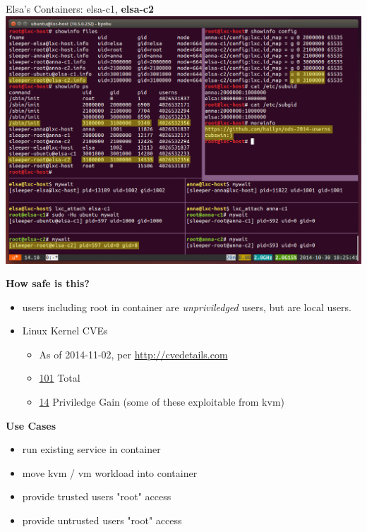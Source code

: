 \documentclass{beamer}
\begin{document}
\begin{frame}
Elsa's Containers: elsa-c1, \textbf{elsa-c2}
\includegraphics[width=\textwidth]{screen-elsa-c2.png}
\end{frame}

\begin{frame}
\textbf{How safe is this?}
\begin{itemize}
\item users including root in container are \textit{unpriviledged} users, but are local users.
\item Linux Kernel CVEs
  \begin{itemize}
  \item As of 2014-11-02, per \url{http://cvedetails.com}
  \item \href{http://www.cvedetails.com/vulnerability-list/vendor_id-33/product_id-47/year-2014/Linux-Linux-Kernel.html}{101} Total
  \item \href{http://www.cvedetails.com/vulnerability-list/vendor_id-33/product_id-47/year-2014/opgpriv-1/Linux-Linux-Kernel.html}{14} Priviledge Gain (some of these exploitable from kvm)
  \end{itemize}
\end{itemize}
\end{frame}

\begin{frame}
\textbf{Use Cases}
  \begin{itemize}
  \item run existing service in container
  \item move kvm / vm workload into container
  \item provide trusted users "root" access
  \item provide untrusted users "root" access
  \end{itemize}
\end{frame}
\end{document}
